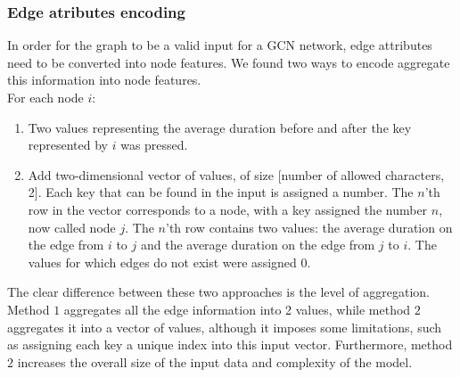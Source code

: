 \subsubsection{Edge atributes encoding}
In order for the graph to be a valid input for a GCN network, edge attributes need to be converted into node features. We found two ways to encode aggregate this information into node features.\\  
For each node $i$:
\begin{enumerate}
	\item Two values representing the average duration before and after the key represented by $i$ was pressed.
	\item Add two-dimensional vector of values, of size [number of allowed characters, 2]. Each key that can be found in the input is assigned a number. The $n$'th row in the vector corresponds to a node, with a key assigned the number $n$, now called node $j$. The $n$'th row contains two values: the average duration on the edge from $i$ to $j$ and the average duration on the edge from $j$ to $i$. The values for which edges do not exist were assigned 0.
\end{enumerate}
The clear difference between these two approaches is the level of aggregation. Method $1$ aggregates all the edge information into 2 values, while method $2$ aggregates it into a vector of values, although it imposes some limitations, such as assigning each key a unique index into this input vector. Furthermore, method $2$ increases the overall size of the input data and complexity of the model.


